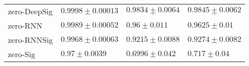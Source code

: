 \begin{tabular}{llll}
zero-DeepSig   &               $  \mathbf{ 0.9998 \pm 0.00013 } $ &           $  \underline{ 0.9834 \pm 0.0064 } $ &         $  \underline{ 0.9845 \pm 0.0062 } $ \\
zero-RNN       &                           $ 0.9989 \pm 0.00052 $ &                             $ 0.96 \pm 0.011 $ &                          $ 0.9625 \pm 0.01 $ \\
zero-RNNSig    &                           $ 0.9968 \pm 0.00063 $ &                          $ 0.9215 \pm 0.0088 $ &                        $ 0.9274 \pm 0.0082 $ \\
zero-Sig       &                              $ 0.97 \pm 0.0039 $ &                           $ 0.6996 \pm 0.042 $ &                           $ 0.717 \pm 0.04 $ \\
\bottomrule
\end{tabular}
